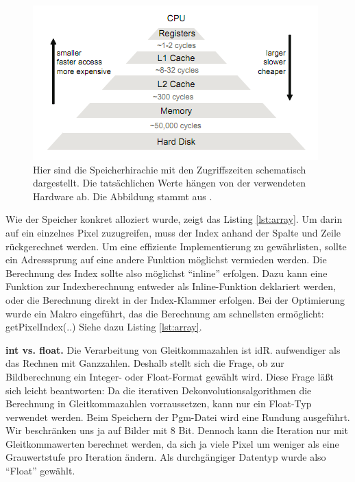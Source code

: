 \documentclass[a4paper,12pt]{article}
\begin{document}
\begin{figure}[htbp]
\centering
\includegraphics[scale=0.8]{cache.png}
\caption{Hier sind die Speicherhirachie mit den Zugriffszeiten schematisch
dargestellt. Die tatsächlichen Werte hängen von der verwendeten Hardware ab.
Die Abbildung stammt aus \cite{fastcode}.}
\label{figure_cache}
\end{figure}


Wie der Speicher konkret alloziert wurde, zeigt das Listing \ref{lst:array}.
Um darin auf ein einzelnes Pixel zuzugreifen, muss der Index anhand der Spalte
und Zeile rückgerechnet werden. Um eine effiziente Implementierung zu
gewährlisten, sollte ein Adresssprung auf eine andere Funktion möglichst
vermieden werden. Die Berechnung des Index sollte also möglichst "`inline"'
erfolgen. Dazu kann eine Funktion zur Indexberechnung entweder als
Inline-Funktion deklariert werden, oder die Berechnung direkt in der
Index-Klammer erfolgen. Bei der Optimierung wurde ein Makro eingeführt, das die
Berechnung am schnellsten ermöglicht: getPixelIndex(..) Siehe dazu Listing
\ref{lst:array}.


\textbf{int vs. float.} Die Verarbeitung von Gleitkommazahlen ist idR.
aufwendiger als das Rechnen mit Ganzzahlen. Deshalb stellt sich die Frage, ob
zur Bildberechnung ein Integer- oder Float-Format gewählt wird. Diese Frage läßt
sich leicht beantworten: Da die iterativen Dekonvolutionsalgorithmen die
Berechnung in Gleitkommazahlen vorraussetzen, kann nur ein Float-Typ verwendet
werden. Beim Speichern der Pgm-Datei wird eine Rundung ausgeführt.
Wir beschränken uns ja auf Bilder mit 8 Bit. Dennoch kann die Iteration nur mit
Gleitkommawerten berechnet werden, da sich ja viele Pixel um weniger als eine
Grauwertstufe pro Iteration ändern. Als durchgängiger Datentyp wurde also
"`Float"' gewählt.
\end{document}
